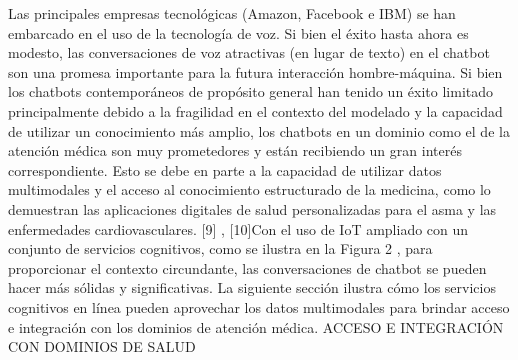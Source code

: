 Las principales empresas tecnológicas (Amazon, Facebook e IBM) se han embarcado en el uso de la tecnología de voz. Si bien el éxito hasta ahora es modesto, las conversaciones de voz atractivas (en lugar de texto) en el chatbot son una promesa importante para la futura interacción hombre-máquina. Si bien los chatbots contemporáneos de propósito general han tenido un éxito limitado principalmente debido a la fragilidad en el contexto del modelado y la capacidad de utilizar un conocimiento más amplio, los chatbots en un dominio como el de la atención médica son muy prometedores y están recibiendo un gran interés correspondiente. Esto se debe en parte a la capacidad de utilizar datos multimodales y el acceso al conocimiento estructurado de la medicina, como lo demuestran las aplicaciones digitales de salud personalizadas para el asma y las enfermedades cardiovasculares. [9] , [10]Con el uso de IoT ampliado con un conjunto de servicios cognitivos, como se ilustra en la Figura 2 , para proporcionar el contexto circundante, las conversaciones de chatbot se pueden hacer más sólidas y significativas. La siguiente sección ilustra cómo los servicios cognitivos en línea pueden aprovechar los datos multimodales para brindar acceso e integración con los dominios de atención médica.
ACCESO E INTEGRACIÓN CON DOMINIOS DE SALUD
